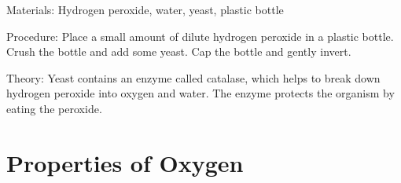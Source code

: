 \begin{multicols}{2}
\begin{description*}
\item[Materials:]{Hydrogen peroxide, water, yeast, plastic bottle}
\item[Procedure:]{Place a small amount of dilute hydrogen peroxide in a plastic bottle. Crush the bottle and add some yeast. Cap the bottle and gently invert.}
\item[Theory:]{Yeast contains an enzyme called catalase, which helps to break down hydrogen peroxide into oxygen and water. The enzyme protects the organism by eating the peroxide.}
\end{description*}

%
%


\section*{Properties of Oxygen}



\end{multicols}
